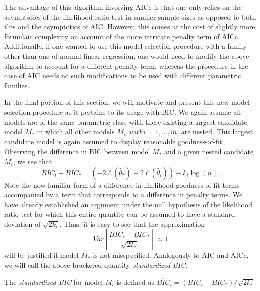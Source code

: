 		The advantage of this algorithm involving AICc is that one only relies on the asymptotics of the likelihood ratio test in smaller sample sizes as opposed
		to both this and the asymptotics of AIC. However, this comes at the cost of slightly more formulaic complexity on account of the more intricate
		penalty term of AICc. Additionally, if one wanted to use this model selection procedure with a family other than one of normal linear regression,
		one would need to modify the above algorithm to account for a different penalty term, whereas the procedure in the case of AIC needs no such modifications
		to be used with different parametric families.

		In the final portion of this section, we will motivate and present this new model selection procedure as it pertains to its usage with BIC. We again assume
		all models are of the same parametric class with there existing a largest candidate model $M_*$ in which all other models $M_i, with i = 1,...,m$, are nested.
		This largest candidate model is again assumed to display reasonable goodness-of-fit. Observing the difference in BIC between model $M_*$ and a given
		nested candidate $M_i$, we see that
		\begin{equation}
			BIC_i - BIC_* = \left( -2 \ell (\hat{\theta}_*) + 2 \ell (\hat{\theta}_i) \right) - k_i \log(n) .
		\end{equation}
		Note the now familiar form of a difference in likelihood goodness-of-fit terms accompanied by a term that corresponds to a difference in penalty terms.
		We have already established an argument under the null hypothesis of the likelihood ratio test for which this entire quantity can be assumed to have
		a standard deviation of $\sqrt{2k_i}$. Thus, it is easy to see that the approximation
		\begin{equation}
			Var \left[ \frac{BIC_i - BIC_*}{\sqrt{2k_i}} \right] \approx 1 
		\end{equation}
		will be justified if model $M_*$ is not misspecified. Analogously to AIC and AICc, we will call the above bracketed quantity \textit{standardized BIC}.
		\begin{definition}
			The \textit{standardized BIC} for model $M_i$ is defined as $\overline{BIC}_i = (BIC_i - BIC_*) / \sqrt{2k_i}$.
		\end{definition}

